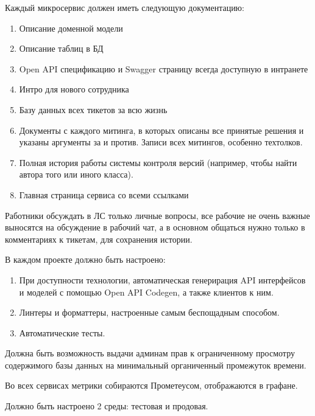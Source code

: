 
Каждый микросервис должен иметь следующую документацию:
\begin{enumerate}
    \item Описание доменной модели
    \item Описание таблиц в БД
    \item Open API спецификацию и Swagger страницу 
          всегда доступную в интранете
    \item Интро для нового сотрудника
    \item Базу данных всех тикетов за всю жизнь
    \item Документы с каждого митинга, в которых описаны 
          все принятые решения и указаны аргументы 
          за и против. Записи всех митингов, особенно 
          техтолков.
    \item Полная история работы системы контроля версий
          (например, чтобы найти автора того или иного класса).
    \item Главная страница сервиса со всеми ссылками
\end{enumerate}

Работники обсуждать в ЛС только личные вопросы, все рабочие 
не очень важные выносятся на обсуждение в рабочий чат,
а в основном общаться нужно только в комментариях к тикетам,
для сохранения истории.

В каждом проекте должно быть настроено:
\begin{enumerate}
    \item При доступности технологии, автоматическая 
          генерирация API интерфейсов и моделей с помощью
          Open API Codegen, а также клиентов к ним.
    \item Линтеры и форматтеры, настроенные самым беспощадным способом.
    \item Автоматические тесты.
\end{enumerate}

Должна быть возможность выдачи админам прав к ограниченному 
просмотру содержимого базы данных на минимальный органиченный 
промежуток времени.

Во всех сервисах метрики собираются Прометеусом, 
отображаются в графане.

Должно быть настроено 2 среды: тестовая и продовая.
